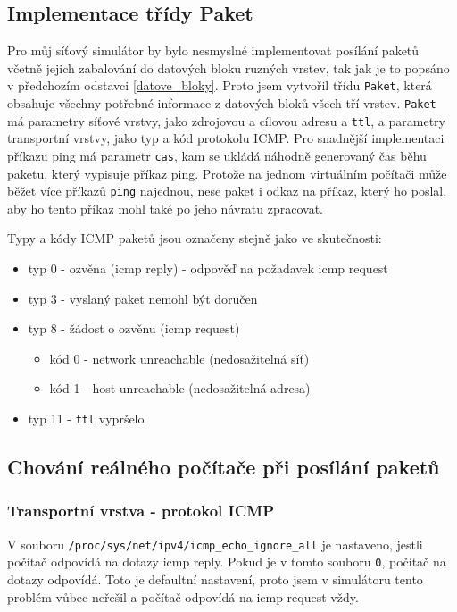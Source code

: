 \subsection{Implementace třídy Paket}
Pro můj síťový simulátor by bylo nesmyslné implementovat posílání paketů včetně jejich zabalování do datových bloku ruzných vrstev, tak jak je to popsáno v předchozím odstavci \ref{datove_bloky}. Proto jsem vytvořil třídu \verb|Paket|, která obsahuje všechny potřebné informace z datových bloků všech tří vrstev. \verb|Paket| má parametry síťové vrstvy, jako zdrojovou a cílovou adresu a \verb|ttl|, a parametry transportní vrstvy, jako typ a kód protokolu ICMP. Pro snadnější implementaci příkazu ping má parametr \verb|cas|, kam se ukládá náhodně generovaný čas běhu paketu, který vypisuje příkaz ping. Protože na jednom virtuálním počítači může běžet více příkazů \verb|ping| najednou, nese paket i odkaz na příkaz, který ho poslal, aby ho tento příkaz mohl také po jeho návratu zpracovat.

Typy a kódy ICMP paketů jsou označeny stejně jako ve skutečnosti:
\begin{itemize}
\item typ 0 - ozvěna (icmp reply) - odpověď na požadavek icmp request
\item typ 3 - vyslaný paket nemohl být doručen
\item typ 8 - žádost o ozvěnu (icmp request)
\begin{itemize}
\item kód 0 - network unreachable (nedosažitelná síť)
\item kód 1 - host unreachable (nedosažitelná adresa)
\end{itemize}
\item typ 11 - \verb|ttl| vypršelo
\end{itemize}


\subsection{Chování reálného počítače při posílání paketů}

\subsubsection{Transportní vrstva - protokol ICMP}

V souboru \verb|/proc/sys/net/ipv4/icmp_echo_ignore_all| je nastaveno, jestli počítač odpovídá na dotazy icmp reply. Pokud je v tomto souboru \verb|0|, počítač na dotazy odpovídá. Toto je defaultní nastavení, proto jsem v simulátoru tento problém vůbec neřešil a počítač odpovídá na icmp request vždy.

